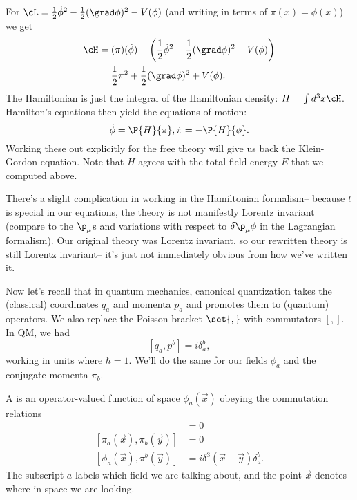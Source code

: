 \begin{exm}
For $\cL=\frac{1}{2}\dot \phi^2 -\frac{1}{2}(\grad \phi)^2 - V(\phi)$ (and writing in terms of $\pi(x)=\dot \phi(x)$) we get
\begin{align*}
\cH&=(\pi)(\dot \phi)-\left(\frac{1}{2}\dot \phi^2 -\frac{1}{2}(\grad \phi)^2 - V(\phi)\right)\\
&=\frac{1}{2}\pi^2 +\frac{1}{2}(\grad \phi)^2+ V(\phi).
\end{align*}
The Hamiltonian is just the integral of the Hamiltonian density: $H=\int d^3 x \cH$. Hamilton's equations then yield the equations of motion:
$$\dot \phi = \P{H}{\pi}, \dot \pi = -\P{H}{\phi}.$$
Working these out explicitly for the free theory will give us back the Klein-Gordon equation. Note that $H$ agrees with the total field energy $E$ that we computed above.
\end{exm}

There's a slight complication in working in the Hamiltonian formalism-- because $t$ is special in our equations, the theory is not manifestly Lorentz invariant (compare to the $\p_\mu$s and variations with respect to $\delta \p_\mu \phi$ in the Lagrangian formalism). Our original theory was Lorentz invariant, so our rewritten theory is still Lorentz invariant-- it's just not immediately obvious from how we've written it.

Now let's recall that in quantum mechanics, canonical quantization takes the (classical) coordinates $q_a$ and momenta $p_a$ and promotes them to (quantum) operators. We also replace the Poisson bracket $\set{,}$ with commutators $[,]$. In QM, we had
$$[q_a,p^b]= i \delta_a^b,$$
working in units where $\hbar=1$. We'll do the same for our fields $\phi_a$ and the conjugate momenta $\pi_b$.

\begin{defn}
A  is an operator-valued function of space $\phi_a(\vec x)$ obeying the commutation relations
\begin{align}
    [\phi_a(\vec{x}),\phi_b(\vec{y})] &= 0 \\
    {[\pi_a(\vec{x}),\pi_b (\vec{y})]} &= 0\\
    {[\phi_a(\vec{x}),\pi^b (\vec{y})]} &= i\delta^3(\vec{x}-\vec{y}) \delta_a^b.
\end{align}
The subscript $a$ labels which field we are talking about, and the point $\vec x$ denotes where in space we are looking.
\end{defn}

